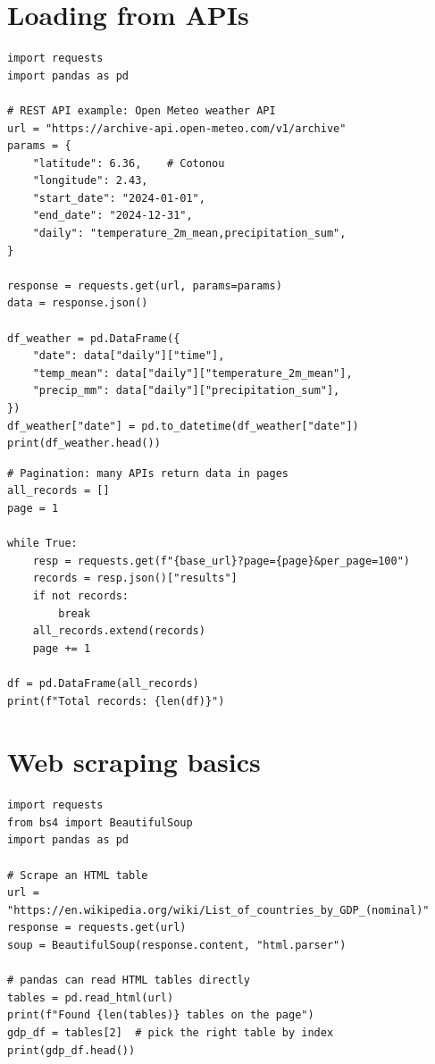 \section{Loading from APIs}

\begin{verbatim}
import requests
import pandas as pd

# REST API example: Open Meteo weather API
url = "https://archive-api.open-meteo.com/v1/archive"
params = {
    "latitude": 6.36,    # Cotonou
    "longitude": 2.43,
    "start_date": "2024-01-01",
    "end_date": "2024-12-31",
    "daily": "temperature_2m_mean,precipitation_sum",
}

response = requests.get(url, params=params)
data = response.json()

df_weather = pd.DataFrame({
    "date": data["daily"]["time"],
    "temp_mean": data["daily"]["temperature_2m_mean"],
    "precip_mm": data["daily"]["precipitation_sum"],
})
df_weather["date"] = pd.to_datetime(df_weather["date"])
print(df_weather.head())
\end{verbatim}

\begin{verbatim}
# Pagination: many APIs return data in pages
all_records = []
page = 1

while True:
    resp = requests.get(f"{base_url}?page={page}&per_page=100")
    records = resp.json()["results"]
    if not records:
        break
    all_records.extend(records)
    page += 1

df = pd.DataFrame(all_records)
print(f"Total records: {len(df)}")
\end{verbatim}

\section{Web scraping basics}

\begin{verbatim}
import requests
from bs4 import BeautifulSoup
import pandas as pd

# Scrape an HTML table
url = "https://en.wikipedia.org/wiki/List_of_countries_by_GDP_(nominal)"
response = requests.get(url)
soup = BeautifulSoup(response.content, "html.parser")

# pandas can read HTML tables directly
tables = pd.read_html(url)
print(f"Found {len(tables)} tables on the page")
gdp_df = tables[2]  # pick the right table by index
print(gdp_df.head())
\end{verbatim}

